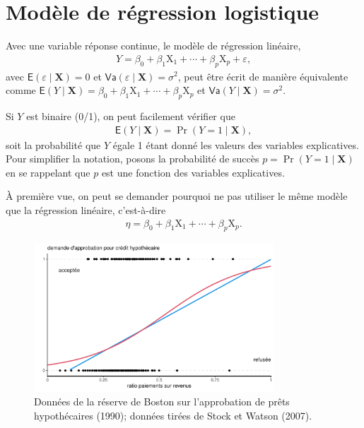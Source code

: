 \documentclass[
  11pt,
  letterpaper,
]{scrbook}
\theoremstyle{definition}
\theoremstyle{remark}
\begin{document}
\hypertarget{moduxe8le-de-ruxe9gression-logistique}{%
\section{Modèle de régression
logistique}\label{moduxe8le-de-ruxe9gression-logistique}}

Avec une variable réponse continue, le modèle de régression linéaire,
\begin{align*}
 Y = \beta_0 + \beta_1\mathrm{X}_1 + \cdots + \beta_p \mathrm{X}_p + \varepsilon,
\end{align*} avec \(\mathsf{E}(\varepsilon \mid \mathbf{X})=0\) et
\(\mathsf{Va}(\varepsilon \mid \mathbf{X})=\sigma^2\), peut être écrit
de manière équivalente comme
\(\mathsf{E}(Y \mid \mathbf{X}) = \beta_0 + \beta_1\mathrm{X}_1 + \cdots + \beta_p\mathrm{X}_p\)
et \(\mathsf{Va}(Y \mid \mathbf{X})=\sigma^2.\)

Si \(Y\) est binaire (0/1), on peut facilement vérifier que
\begin{align*}
\mathsf{E}(Y \mid \mathbf{X}) = \Pr(Y=1 \mid  \mathbf{X}),
\end{align*} soit la probabilité que \(Y\) égale 1 étant donné les
valeurs des variables explicatives. Pour simplifier la notation, posons
la probabilité de succès \(p = \Pr(Y=1 \mid \mathbf{X})\) en se
rappelant que \(p\) est une fonction des variables explicatives.

À première vue, on peut se demander pourquoi ne pas utiliser le même
modèle que la régression linéaire, c'est-à-dire \begin{align*}
\eta=\beta_0 + \beta_1\mathrm{X}_1 + \cdots + \beta_p \mathrm{X}_p.
\end{align*}

\begin{figure}[ht!]

{\centering \includegraphics[width=0.8\textwidth,height=\textheight]{reglogistique_files/figure-pdf/fig-demandecredit-1.pdf}

}

\caption{\label{fig-demandecredit}Données de la réserve de Boston sur
l'approbation de prêts hypothécaires (1990); données tirées de Stock et
Watson (2007).}

\end{figure}
\end{document}
